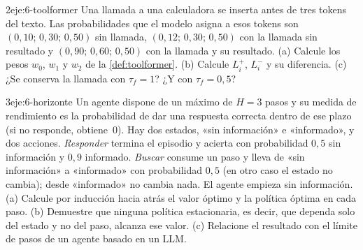 \begin{ejercicio}{2}{eje:6-toolformer}
Una llamada a una calculadora se inserta antes de tres tokens del texto. Las probabilidades que el modelo asigna a esos tokens son $(0{,}10;\,0{,}30;\,0{,}50)$ sin llamada, $(0{,}12;\,0{,}30;\,0{,}50)$ con la llamada sin resultado y $(0{,}90;\,0{,}60;\,0{,}50)$ con la llamada y su resultado. (a) Calcule los pesos $w_0$, $w_1$ y $w_2$ de la \cref{def:toolformer}. (b) Calcule $L_i^{+}$, $L_i^{-}$ y su diferencia. (c) ¿Se conserva la llamada con $\tau_f=1$? ¿Y con $\tau_f=0{,}5$?
\end{ejercicio}

\begin{ejercicio}{3}{eje:6-horizonte}
Un agente dispone de un máximo de $H=3$ pasos y su medida de rendimiento es la probabilidad de dar una respuesta correcta dentro de ese plazo (si no responde, obtiene~0). Hay dos estados, «sin información» e «informado», y dos acciones. \emph{Responder} termina el episodio y acierta con probabilidad $0{,}5$ sin información y $0{,}9$ informado. \emph{Buscar} consume un paso y lleva de «sin información» a «informado» con probabilidad $0{,}5$ (en otro caso el estado no cambia); desde «informado» no cambia nada. El agente empieza sin información. (a) Calcule por inducción hacia atrás el valor óptimo y la política óptima en cada paso. (b) Demuestre que ninguna política estacionaria, es decir, que dependa solo del estado y no del paso, alcanza ese valor. (c) Relacione el resultado con el límite de pasos de un agente basado en un LLM.
\end{ejercicio}
